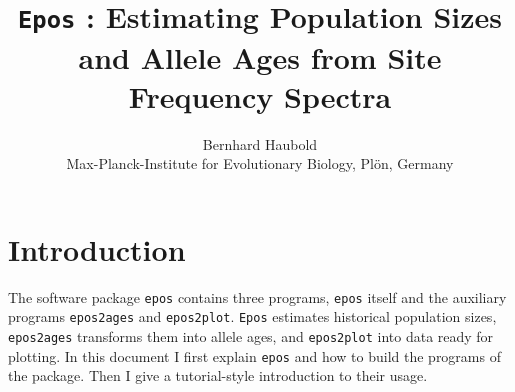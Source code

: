 \documentclass[a4paper, english]{article}
\newcommand{\ty}{\texttt}
\begin{document}
\title{\ty{Epos} : Estimating Population Sizes and Allele Ages from
  Site Frequency Spectra}
\author{Bernhard Haubold\\\small Max-Planck-Institute for Evolutionary
  Biology, Pl\"on, Germany}
\date{}
\maketitle

\tableofcontents

\section{Introduction} 
The software package \ty{epos} contains three programs, \ty{epos}
itself and the auxiliary programs \ty{epos2ages} and \ty{epos2plot}. \ty{Epos} estimates historical population
sizes, \ty{epos2ages} transforms them into allele ages, and
\ty{epos2plot} into data ready for plotting. In this document I first
explain \ty{epos} and how to build the programs of the package. Then I
give a tutorial-style introduction to their usage.
\end{document}
